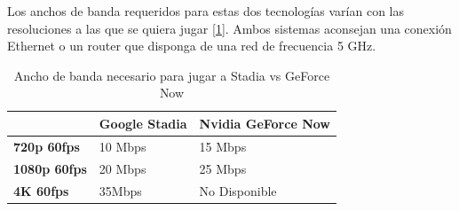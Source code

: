 Los anchos de banda requeridos para estas dos tecnolog\'ias var\'ian con las resoluciones a las que se quiera jugar [\ref{stadiovsgeforce}]. Ambos sistemas aconsejan una conexi\'on Ethernet o un router que disponga de una red de frecuencia 5 GHz.

\begin{table}[h]
    \centering
    \begin{tabular}{lll}
        \toprule
        {}  & \textbf{Google Stadia} & \textbf{Nvidia GeForce Now} \\
        \midrule
        \textbf{720p 60fps} & 10 Mbps & 15 Mbps\\
        \textbf{1080p 60fps} & 20 Mbps & 25 Mbps \\
		\textbf{4K 60fps} & 35Mbps & No Disponible \\
        \bottomrule
    \end{tabular}
\caption{Ancho de banda necesario para jugar a Stadia vs GeForce Now}
\label{stadiovsgeforce}
\end{table}




